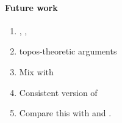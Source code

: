 \documentclass[a4paper,UKenglish,numberwithinsect,cleveref,thm-restate]{lipics-v2021}
\theoremstyle{plain}
\begin{document}
\paragraph*{Future work}
\begin{enumerate}
  \item {}, \cite{Davies2001b}, \cite{Kavvos2020}
  \item topos-theoretic arguments
  \item Mix with \cite{Kavvos2017b}
  \item Consistent version of \cite{Kavvos2017b}
  \item Compare this with \cite{Shamkanov2014} and \cite{Shamkanov2016a}.
\end{enumerate}
\cite{Davies2001b}



\appendix


%
%
%
\end{document}
